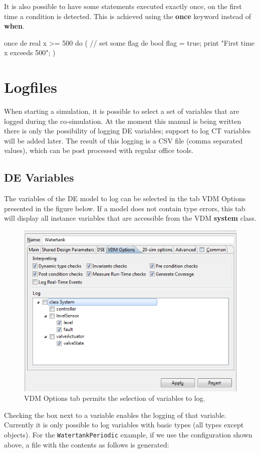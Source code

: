\documentclass{crescendorepchap}
\newcommand{\vdmkeyw}[1]{{\bf\ttfamily #1}}
\begin{document}
It is also possible to have some statements executed exactly once, on
the first time a condition is detected. This is achieved using the
\vdmkeyw{once} keyword instead of \vdmkeyw{when}.

\begin{dcl}
once de real x >= 500 do
(
// set some flag
de bool flag = true;
print "First time x exceeds 500";
)
\end{dcl}

\section{Logfiles}\label{sec:Logfiles}

When starting a simulation, it is possible to select a set of variables
that are logged during the co-simulation. At the moment this manual
is being written there is only the possibility of logging DE variables;
support to log CT variables will be added later. The result of this
logging is a CSV file (comma separated values), which can be post processed with regular office tools.

\subsection{DE Variables}

The variables of the DE model to log can be selected in the tab VDM
Options presented in the figure below. If a model does not contain type
errors, this tab will display all instance variables that are accessible
from the VDM \vdmkeyw{system} class.

\begin{figure}[htbp]
\centering
\includegraphics[width=.6\textwidth]{images/DestecsLoggingVariables.png}
\caption{VDM Options tab permits the selection of variables to log.}
\end{figure}

Checking the box next to a variable enables the logging of that
variable. Currently it is only possible to log variables with basic
types (all types except objects).
For the \texttt{WatertankPeriodic} example, if we use the configuration
shown above, a file with the contents as follows is generated:
\end{document}
